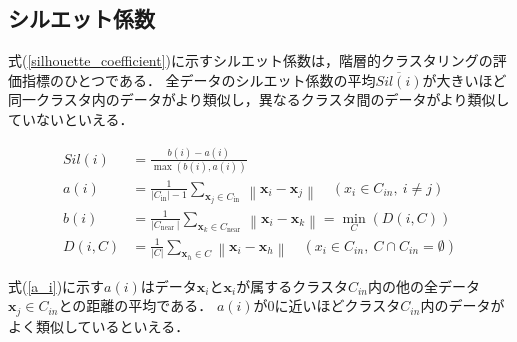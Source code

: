 \documentclass[12pt,a4j,dvipdfmx]{jreport}
\begin{document}





\newpage

\subsection{シルエット係数}
式(\ref{silhouette_coefficient})に示すシルエット係数は，階層的クラスタリングの評価指標のひとつである\cite{aranganayagi_clustering_2007}．
全データのシルエット係数の平均$\overline{Sil(i)}$が大きいほど同一クラスタ内のデータがより類似し，異なるクラスタ間のデータがより類似していないといえる．

\begin{align}
  Sil(i) &= \frac{b(i) - a(i)}{\max ( b(i) , a(i))}
  \label{silhouette_coefficient}
  \\
  a(i)
  &=\frac{1}{\left|C_{\text {in}}\right|-1} \sum_{\boldsymbol{x}_{j} \in C_{\text {in }}}\left\|\boldsymbol{x}_{i}-\boldsymbol{x}_{j}\right\|
  \quad(x_i \in C_{in} ,~ i \neq j)
  \label{a_i}
  \\
  b(i)
  &=\frac{1}{\left|C_{\text {near }}\right|} \sum_{\boldsymbol{x}_{k} \in C_{\text {near }}}\left\|\boldsymbol{x}_{i}-\boldsymbol{x}_{k}\right\|
  = \min_C{\left( D(i, C) \right)}
  \label{b_i}
  \\
  D(i, C)
  &=\frac{1}{\left|C \right|} \sum_{\boldsymbol{x}_{h} \in C}\left\|\boldsymbol{x}_{i}-\boldsymbol{x}_{h}\right\|
  \quad (x_i \in C_{in},~ C \cap C_{in} = \emptyset)
  \label{d_ic}
\end{align}

式(\ref{a_i})に示す$a(i)$はデータ$\bm{x}_i$と$\bm{x}_i$が属するクラスタ$C_{in}$内の他の全データ$\bm{x}_j \in C_{in}$との距離の平均である．
$a(i)$が0に近いほどクラスタ$C_{in}$内のデータがよく類似しているといえる．
\end{document}
